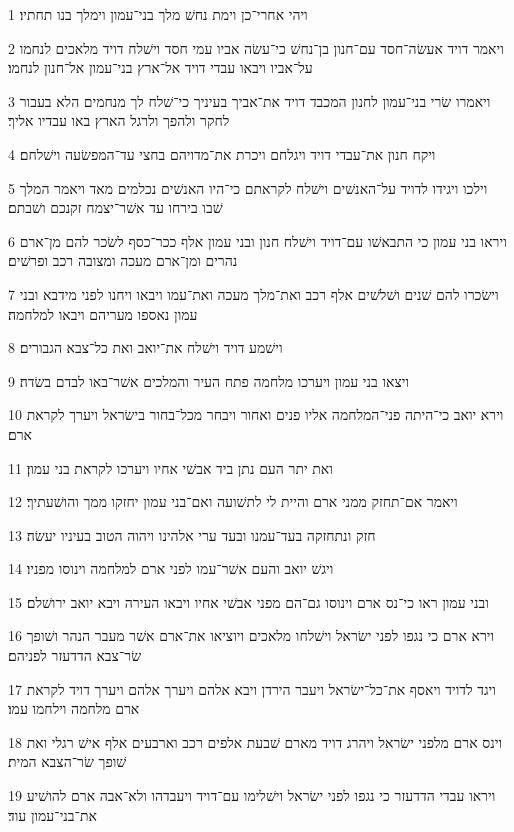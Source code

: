 \par 1 ויהי אחרי־כן וימת נחשׁ מלך בני־עמון וימלך בנו תחתיו׃
\par 2 ויאמר דויד אעשׂה־חסד עם־חנון בן־נחשׁ כי־עשׂה אביו עמי חסד וישׁלח דויד מלאכים לנחמו על־אביו ויבאו עבדי דויד אל־ארץ בני־עמון אל־חנון לנחמו׃
\par 3 ויאמרו שׂרי בני־עמון לחנון המכבד דויד את־אביך בעיניך כי־שׁלח לך מנחמים הלא בעבור לחקר ולהפך ולרגל הארץ באו עבדיו אליך׃
\par 4 ויקח חנון את־עבדי דויד ויגלחם ויכרת את־מדויהם בחצי עד־המפשׂעה וישׁלחם׃
\par 5 וילכו ויגידו לדויד על־האנשׁים וישׁלח לקראתם כי־היו האנשׁים נכלמים מאד ויאמר המלך שׁבו בירחו עד אשׁר־יצמח זקנכם ושׁבתם׃
\par 6 ויראו בני עמון כי התבאשׁו עם־דויד וישׁלח חנון ובני עמון אלף ככר־כסף לשׂכר להם מן־ארם נהרים ומן־ארם מעכה ומצובה רכב ופרשׁים׃
\par 7 וישׂכרו להם שׁנים ושׁלשׁים אלף רכב ואת־מלך מעכה ואת־עמו ויבאו ויחנו לפני מידבא ובני עמון נאספו מעריהם ויבאו למלחמה׃
\par 8 וישׁמע דויד וישׁלח את־יואב ואת כל־צבא הגבורים׃
\par 9 ויצאו בני עמון ויערכו מלחמה פתח העיר והמלכים אשׁר־באו לבדם בשׂדה׃
\par 10 וירא יואב כי־היתה פני־המלחמה אליו פנים ואחור ויבחר מכל־בחור בישׂראל ויערך לקראת ארם׃
\par 11 ואת יתר העם נתן ביד אבשׁי אחיו ויערכו לקראת בני עמון׃
\par 12 ויאמר אם־תחזק ממני ארם והיית לי לתשׁועה ואם־בני עמון יחזקו ממך והושׁעתיך׃
\par 13 חזק ונתחזקה בעד־עמנו ובעד ערי אלהינו ויהוה הטוב בעיניו יעשׂה׃
\par 14 ויגשׁ יואב והעם אשׁר־עמו לפני ארם למלחמה וינוסו מפניו׃
\par 15 ובני עמון ראו כי־נס ארם וינוסו גם־הם מפני אבשׁי אחיו ויבאו העירה ויבא יואב ירושׁלם׃
\par 16 וירא ארם כי נגפו לפני ישׂראל וישׁלחו מלאכים ויוציאו את־ארם אשׁר מעבר הנהר ושׁופך שׂר־צבא הדדעזר לפניהם׃
\par 17 ויגד לדויד ויאסף את־כל־ישׂראל ויעבר הירדן ויבא אלהם ויערך אלהם ויערך דויד לקראת ארם מלחמה וילחמו עמו׃
\par 18 וינס ארם מלפני ישׂראל ויהרג דויד מארם שׁבעת אלפים רכב וארבעים אלף אישׁ רגלי ואת שׁופך שׂר־הצבא המית׃
\par 19 ויראו עבדי הדדעזר כי נגפו לפני ישׂראל וישׁלימו עם־דויד ויעבדהו ולא־אבה ארם להושׁיע את־בני־עמון עוד׃

